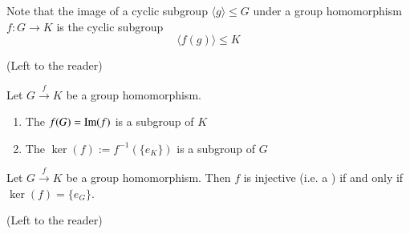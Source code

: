 \documentclass[12pt, a4paper, twoside, openright, titlepage]{book}
\begin{document}
\begin{rmk}{}{}
        Note that the image of a cyclic subgroup $\langle g \rangle \leq G$ under a group homomorphism $f: G \rightarrow K$ is the cyclic subgroup \begin{equation}
                \langle f(g) \rangle \leq K
        \end{equation}
\end{rmk}
\begin{proof*}{}{}
        (Left to the reader)
\end{proof*}

\begin{cor}{}{}
        Let $G \xrightarrow{f} K$ be a group homomorphism. \begin{enumerate}
                \item The  $f(G) = \operatorname{Im}(f)$ is a subgroup of $K$
                \item The  $\ker(f) := f^{-1}(\{e_K\})$ is a subgroup of $G$
        \end{enumerate}
\end{cor}

\begin{prop}{}{}
        Let $G\xrightarrow{f} K$ be a group homomorphism. Then $f$ is injective (i.e. a ) if and only if $\ker(f) = \{e_G\}$.
\end{prop}
\begin{proof*}{}{}
        (Left to the reader)
\end{proof*}
\end{document}
